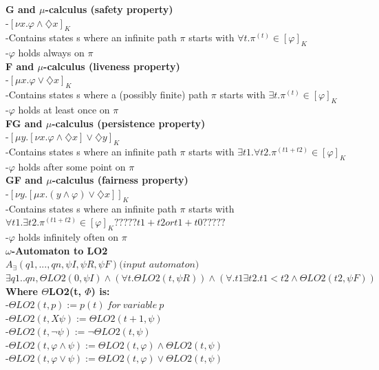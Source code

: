 \documentclass{article}
\begin{document}
\begin{multicols}{4}
\textbf{G and $\mu$-calculus (safety property)} \\
-$[\nu x. \varphi \wedge \diamondsuit x]_{K} $ \\
-Contains states s where an infinite path $\pi$ starts with $\forall t. \pi^{(t)} \in [\varphi]_{K}$ \\
-$\varphi$ holds always on $\pi$ \\
\textbf{F and $\mu$-calculus (liveness property)} \\
-$[\mu x. \varphi \vee \diamondsuit x]_{K} $ \\
-Contains states s where a (possibly finite) path $\pi$ starts with $\exists t. \pi^{(t)} \in [\varphi]_{K}$ \\
-$\varphi$ holds at least once on $\pi$ \\
\textbf{FG and $\mu$-calculus (persistence property)} \\
-$[\mu y.[\nu x. \varphi \wedge \diamondsuit x] \vee \diamondsuit y]_{K} $ \\
-Contains states s where an infinite path $\pi$ starts with $\exists t1.\forall t2. \pi^{(t1+t2)} \in [\varphi]_{K}$ \\
-$\varphi$ holds after some point on $\pi$ \\
\textbf{GF and $\mu$-calculus (fairness property)} \\
-$[\nu y.[\mu x. (y \wedge \varphi) \vee \diamondsuit x]]_{K} $ \\
-Contains states s where an infinite path $\pi$ starts with $\forall t1.\exists t2. \pi^{(t1+t2)} \in [\varphi]_{K} ?????t1+t2 or t1+t0?????$ \\
-$\varphi$ holds infinitely often on $\pi$ \\

\textbf{$\omega$-Automaton to LO2} \\
$A_{\exists}({q1,...,qn}, \psi I, \psi R, \psi F) \textit{(input automaton)}$ \\
$\exists q1..qn, \Theta LO2(0,\psi I) \wedge (\forall t.\Theta LO2(t,\psi R)) \wedge (\forall.t1\exists t2. t1 < t2 \wedge \Theta LO2(t2,\psi F))$ \\
\textbf{Where $\Theta$LO2(t, $\Phi$) is:} \\
-$\Theta LO2(t, p) := p(t)\ for\ variable\ p $ \\
-$\Theta LO2(t, X\psi) := \Theta LO2(t+1, \psi)$ \\
-$\Theta LO2(t, \neg\psi) := \neg\Theta LO2(t, \psi)$ \\
-$\Theta LO2(t, \varphi\wedge\psi) := \Theta LO2(t, \varphi) \wedge \Theta LO2(t, \psi)$ \\
-$\Theta LO2(t, \varphi\vee\psi) := \Theta LO2(t, \varphi) \vee \Theta LO2(t, \psi)$ \\


\end{multicols}
\end{document}
